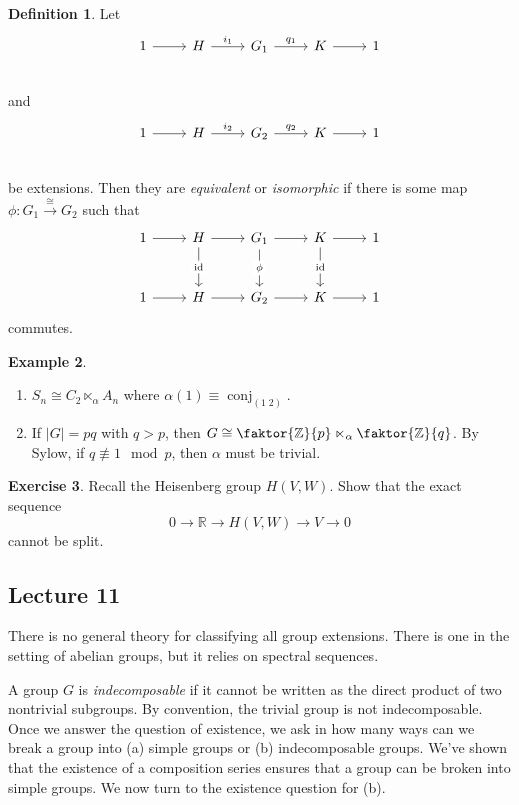 \documentclass[10pt,letterpaper,cm]{nupset}
\theoremstyle{definition}
\newtheorem{definition}{Definition}[subsection]
\newtheorem{exmp}[definition]{Example}
\theoremstyle{theorem}
\newtheorem{exercise}[definition]{Exercise}
\theoremstyle{remark}
\newcommand{\R}{\mathbb R}
\newcommand{\Z}{\mathbb Z}
\newcommand{\1}{\mathbf{1}}
\newcommand{\0}{\vec 0}
\DeclareMathOperator{\id}{\mathrm{id}}
\DeclareMathOperator{\conj}{conj}
\begin{document}
\begin{definition}
Let \[
	\begin{tikzcd}
	1\rar &H\rar["i_1" above] & G_1 \rar["q_1" above] & K\rar& 1 \\
	\end{tikzcd}
\]
and 
\[
	\begin{tikzcd}
	1\rar &H\rar["i_2" above] & G_2 \rar["q_2" above] & K\rar& 1 \\
	\end{tikzcd}
\]
be extensions. Then they are \textit{equivalent} or \textit{isomorphic} if there is some map $\phi : G_1 \overset{\cong}{\longrightarrow} G_2$ such that 
\[
\begin{tikzcd}[row sep =large]
1 \arrow[r] & H \arrow[r] \arrow[d, "\id" description] & G_1 \arrow[r] \arrow[d, "\phi" description] & K \arrow[r] \arrow[d, "\id" description] & 1 \\
1 \arrow[r] & H \arrow[r] & G_2 \arrow[r] & K \arrow[r] & 1
\end{tikzcd}
\]
commutes.
\end{definition}

\begin{exmp} $ $
\begin{enumerate}
\item $S_n \cong C_2 \ltimes_{\alpha} A_n$ where $\alpha(1) \equiv \conj_{(1 \; 2)}$.
\item  If $\left\lvert{G}\right\rvert = pq$ with $q>p$, then $G \cong \faktor{\Z}{p} \ltimes_{\alpha} \faktor{\Z}{q}$. By Sylow,  if $q\not \equiv 1 \mod p$, then $\alpha$ must be trivial. 
\end{enumerate}
\end{exmp}

\begin{exercise}
Recall  the Heisenberg group  $H(V, W)$. Show that the exact sequence $$0 \to \R \to H(V, W) \to V \to 0$$ cannot be split.
\end{exercise}

\subsection{Lecture 11}

There is no general theory for classifying all group extensions. There is one in the setting of abelian groups, but it relies on spectral sequences.

A group $G$ is \textit{indecomposable} if it cannot be written as the direct product of two nontrivial subgroups. By convention, the trivial group is not indecomposable. 
Once we answer the question of existence, we ask in how many ways can we break a group into (a) simple groups or (b) indecomposable groups. We've shown that the existence of a composition series ensures that a group can be broken into simple groups. We now turn to the existence question for (b).
\end{document}
